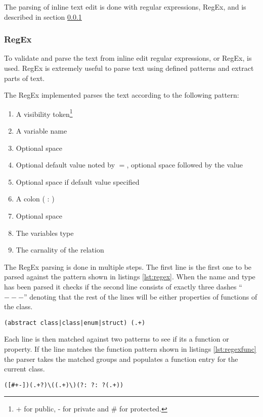 The parsing of inline text edit is done with regular expressions, RegEx, and is described in section \ref{sec:regex}

\subsubsection{RegEx}
\label{sec:regex}
To validate and parse the text from inline edit regular expressions, or RegEx, is used. RegEx is extremely useful to parse text using defined patterns and extract parts of text.

The RegEx implemented parses the text according to the following pattern:
\begin{enumerate}
\item A visibility token\footnote{+ for public, - for private and \# for protected.}
\item A variable name
\item Optional space
\item Optional default value noted by $=$, optional space followed by the value
\item Optional space if default value specified
\item A colon ( : )
\item Optional space
\item The variables type
\item The carnality of the relation
\end{enumerate}

The RegEx parsing is done in multiple steps. The first line is the first one to be parsed against the pattern shown in listings \ref{lst:regex}. When the name and type has been parsed it checks if the second line consists of exactly three dashes ``$---$'' denoting that the rest of the lines will be either properties of functions of the class.

\begin{lstlisting}[caption={RegEx for class type and name matching},label=lst:regex]
(abstract class|class|enum|struct) (.+)
\end{lstlisting}

Each line is then matched against two patterns to see if its a function or property. If the line matches the function pattern shown in listings \ref{lst:regexfunc} the parser takes the matched groups and populates a function entry for the current class.

\begin{lstlisting}[caption={RegEx for function matching},label=lst:regexfunc]
([#+-])(.+?)\((.+)\)(?: ?: ?(.+))
\end{lstlisting}


